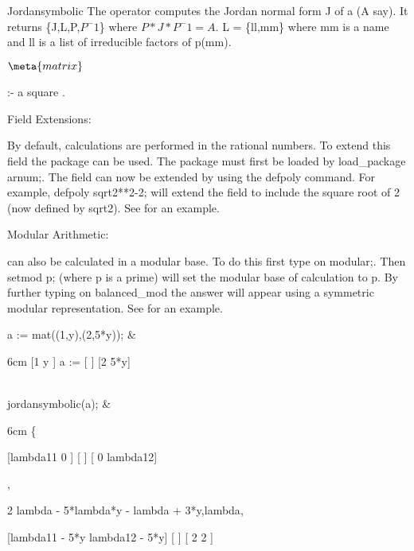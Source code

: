 \begin{Operator}{Jordansymbolic}
The operator  computes the Jordan normal form J
of a  (A say). It returns \{J,L,P,$P^-1$\} where
$P*J*P^-1 = A$. L = \{ll,mm\} where mm is a name and ll is a list of
irreducible factors of p(mm).

\begin{Syntax}
\(\meta{matrix}\)

 :- a square .
\end{Syntax}

Field Extensions:

By default, calculations are performed in the rational numbers. To 
extend this field the  package can be used. The package must
first be loaded by  load\_package arnum;. The field can now be extended
by using the defpoly command. For example, defpoly sqrt2**2-2; will
extend the field to include the square root of 2 (now defined by sqrt2).
See  for an example.

Modular Arithmetic:

 can also be calculated in a modular base. To do this 
first type on  modular;. Then setmod p; (where p is a prime) will set 
the modular base of calculation to p. By further typing on balanced\_mod
the answer will appear using a symmetric modular representation. See 
 for an example.



\begin{Examples}

 a := mat((1,y),(2,5*y)); &
\begin{multilineoutput}{6cm}
     [1   y ]
a := [      ]
     [2  5*y]
\end{multilineoutput}\\

 jordansymbolic(a); &
\begin{multilineoutput}{6cm}
\{

 [lambda11     0    ]
 [                  ]
 [   0      lambda12]

 ,

         2
 {{lambda  - 5*lambda*y - lambda + 3*y},lambda},


 [lambda11 - 5*y  lambda12 - 5*y]
 [                              ]
 [      2               2       ]


\end{multilineoutput}
\end{Examples}
\end{Operator}
